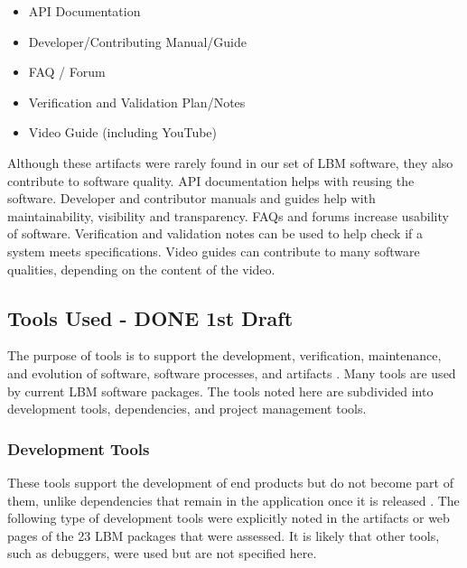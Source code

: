 \documentclass[12pt, notitlepage]{article}
\begin{document}
\begin{singlespace}
	\begin{multicols}{2}	
		\begin{itemize}
			\item API Documentation
			\item Developer/Contributing Manual/Guide
			\item FAQ / Forum
			\item Verification and Validation Plan/Notes
			\item Video Guide (including YouTube)
		\end{itemize}
	\end{multicols}
\end{singlespace}

Although these artifacts were rarely found in our set of LBM software, they also contribute to software quality. API documentation helps with reusing the software. Developer and contributor manuals and guides help with maintainability, visibility and transparency. FAQs and forums increase usability of software. Verification and validation notes can be used to help check if a system meets specifications. Video guides can contribute to many software qualities, depending on the content of the video. 

\subsection{Tools Used - DONE 1st Draft}
The purpose of tools is to support the development, verification, maintenance, and evolution of software, software processes, and artifacts \citep{ghezzi1991fundamentals}. Many tools are used by current LBM software packages. The tools noted here are subdivided into development tools, dependencies, and project management tools.

\subsubsection{Development Tools}

These tools support the development of end products but do not become part of them, unlike dependencies that remain in the application once it is released \citep{ghezzi1991fundamentals}. The following type of development tools were explicitly noted in the artifacts or web pages of the 23 LBM packages that were assessed. It is likely that other tools, such as debuggers, were used but are not specified here.
\end{document}
